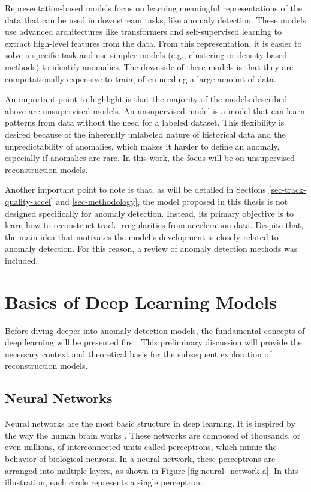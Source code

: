 Representation-based models focus on learning meaningful representations of the data that can be used in downstream tasks, like anomaly detection.  These models use advanced architectures like transformers and self-supervised learning to extract high-level features from the data. From this representation, it is easier to solve a specific task and use simpler models (e.g., clustering or density-based methods) to identify anomalies. The downside of these models is that they are computationally expensive to train, often needing a large amount of data.

An important point to highlight is that the majority of the models described above are unsupervised models. An unsupervised model is a model that can learn patterns from data without the need for a labeled dataset. This flexibility is desired because of the inherently unlabeled nature of historical data and the unpredictability of anomalies, which makes it harder to define an anomaly, especially if anomalies are rare. In this work, the focus will be on unsupervised reconstruction models.

Another important point to note is that, as will be detailed in Sections \ref{sec-track-quality-accel} and \ref{sec-methodology}, the model proposed in this thesis is not designed specifically for anomaly detection. Instead, its primary objective is to learn how to reconstruct track irregularities from acceleration data. Despite that, the main idea that motivates the model's development is closely related to anomaly detection. For this reason, a review of anomaly detection methods was included.

\section{Basics of Deep Learning Models}

Before diving deeper into anomaly detection models, the fundamental concepts of deep learning will be presented first. This preliminary discussion will provide the necessary context and theoretical basis for the subsequent exploration of reconstruction models.

\subsection{Neural Networks} \label{sec-Neural_networks}

Neural networks are the most basic structure in deep learning. It is inspired by the way the human brain works \cite{AGATONOVICKUSTRIN2000717}. These networks are composed of thousands, or even millions, of interconnected units called perceptrons, which mimic the behavior of biological neurons. In a neural network, these perceptrons are arranged into multiple layers, as shown in Figure \ref{fig:neural_network-a}. In this illustration, each circle represents a single perceptron. 

